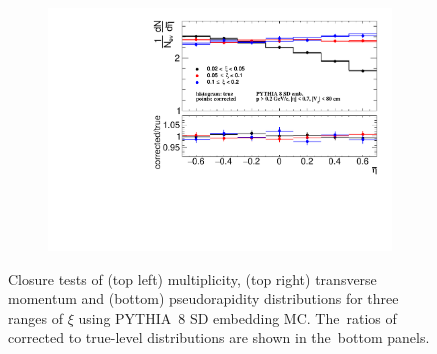 \begin{figure}[b!]
\begin{subfigure}{.49\textwidth}
		\includegraphics[width=\textwidth,page=1]{chapters/chrgSTAR/img/closure/eta_test.pdf}
	\end{subfigure}
	\hfill
	\begin{minipage}{.48\textwidth}
		\caption{Closure tests of (top left) multiplicity, (top right) transverse momentum and (bottom) pseudorapidity distributions for three ranges of $\xi$ using PYTHIA~8 SD embedding MC. The~ratios of corrected to true-level distributions are shown in the~bottom panels.}
		\label{fig:closure_star}
	\end{minipage}
	
\end{figure}


 
